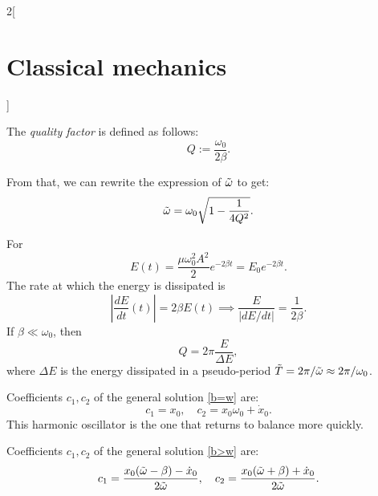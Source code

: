\documentclass[../../../main.tex]{subfiles}
\begin{document}
\begin{multicols}{2}[\section{Classical mechanics}]
\begin{prop}
    \end{prop}
    \begin{definition}
        The \textit{quality factor} is defined as follows: $$Q:=\frac{\omega_0}{2\beta}.$$
    \end{definition}
    \noindent From that, we can rewrite the expression of $\Tilde{\omega}$ to get: $$\Tilde{\omega}=\omega_0\sqrt{1-\frac{1}{4Q^2}}.$$
    \begin{prop}
        For
        $$E(t)=\frac{\mu\omega_0^2A^2}{2}e^{-2\beta t}=E_0e^{-2\beta t}.$$ The rate at which the energy is dissipated is $$\left|\frac{dE}{dt}(t)\right|=2\beta E(t)\implies\frac{E}{\left|dE/dt\right|}=\frac{1}{2\beta}.$$
        If $\beta\ll\omega_0$, then $$Q=2\pi\frac{E}{\Delta E},$$ where $\Delta E$ is the energy dissipated in a pseudo-period $\Tilde{T}=2\pi/\Tilde{\omega}\approx2\pi/\omega_0$.
    \end{prop}
    \begin{prop}[Critically damped harmonic oscillator: $\beta=\omega_0$]
        Coefficients $c_1,c_2$ of the general solution \eqref{b=w} are: $$c_1=x_0,\quad c_2=x_0\omega_0+\dot{x}_0.$$ This harmonic oscillator is the one that returns to balance more quickly.
    \end{prop}
    \begin{prop}
        Coefficients $c_1,c_2$ of the general solution \eqref{b>w} are: $$c_1=\frac{x_0(\Tilde{\omega}-\beta)-\dot{x}_0}{2\Tilde{\omega}},\quad c_2=\frac{x_0(\Tilde{\omega}+\beta)+\dot{x}_0}{2\Tilde{\omega}}.$$
    \end{prop}

\end{multicols}
\end{document}
